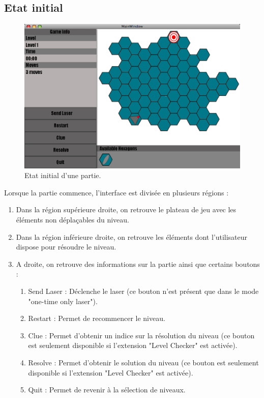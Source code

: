 \documentclass[]{article}
\begin{document}
\subsection{Etat initial }\label{sec:game1}
\begin{figure}[!htb]
\begin{center}
  \includegraphics[width=\textwidth]{Game1.png}
  \caption{Etat initial d'une partie.}\label{fig:game1}
\end{center}
\end{figure}

Lorsque la partie commence, l'interface est divisée en plusieurs régions :
\begin{enumerate}
\item Dans la région supérieure droite, on retrouve le plateau de jeu avec les éléments non déplaçables du niveau.
\item Dans la région inférieure droite, on retrouve les éléments dont l'utilisateur dispose pour résoudre le niveau.
\item A droite, on retrouve des informations sur la partie ainsi que certains boutons :
\begin{enumerate}
\item Send Laser : Déclenche le laser (ce bouton n'est présent que dans le mode "one-time only laser").
\item Restart : Permet de recommencer le niveau.
\item Clue : Permet d'obtenir un indice sur la résolution du niveau (ce bouton est seulement disponible si l'extension "Level Checker" est activée).
\item Resolve : Permet d'obtenir le solution du niveau (ce bouton est seulement disponible si l'extension "Level Checker" est activée).
\item Quit : Permet de revenir à la sélection de niveaux.
\end{enumerate}
\end{enumerate}
\newpage 
\end{document}
